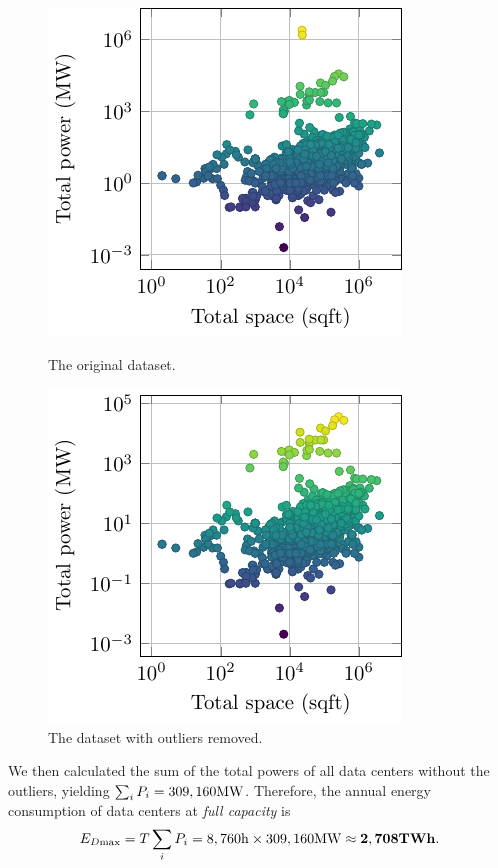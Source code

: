 \documentclass[12pt]{article}
\begin{document}
\begin{figure}[t]
	\centering
	\begin{minipage}{0.48\textwidth}
		\centering
		\includegraphics{figures/data/datacenters.pdf}
		\caption{The original dataset.}
		\label{fig_data_datacenters_original}
	\end{minipage}
	\hfill
	\begin{minipage}{0.48\textwidth}
		\centering
		\includegraphics{figures/data/datacenters_clean.pdf}
		\caption{The dataset with outliers removed.}
		\label{fig_data_datacenters_clean}
	\end{minipage}
\end{figure}

We then calculated the sum of the total powers of all data centers without the outliers, yielding $\sum_i P_i = 309,160 \rm MW$. Therefore, the annual energy consumption of data centers at \textit{full capacity} is
\begin{equation}
	E_{D \rm max} = T \sum_i P_i =
	\rm 8,760h \times 309,160MW \approx \mathbf{2,708TWh}.
\end{equation}
\end{document}
